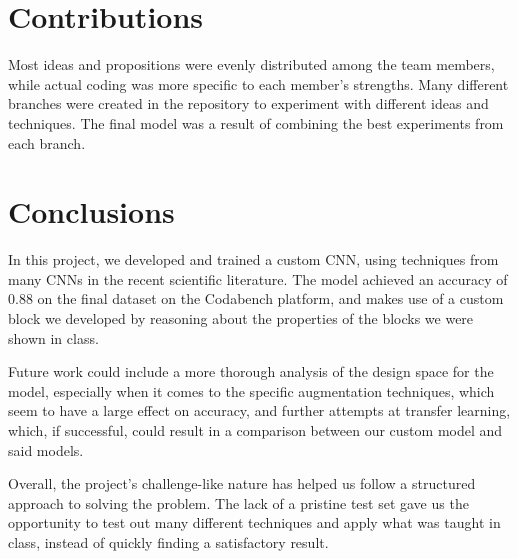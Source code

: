 \documentclass[11pt]{article}
\begin{document}
\begin{multicols}{2}
      \section{Contributions}

      Most ideas and propositions were evenly distributed among the team
      members, while actual coding was more specific to each member's
      strengths. Many different branches were created in the repository to
      experiment with different ideas and techniques. The final model was a
      result of combining the best experiments from each branch.

      \section{Conclusions}

      In this project, we developed and trained a custom CNN, using techniques from many CNNs in the recent scientific literature. The model achieved an accuracy of 0.88 on the final dataset on the Codabench platform, and makes use of a custom block we developed by reasoning about the properties of the blocks we were shown in class. 

      Future work could include a more thorough analysis of the design space for the model, especially when it comes to the specific augmentation techniques, which seem to have a large effect on accuracy, and further attempts at transfer learning, which, if successful, could result in a comparison between our custom model and said models.

      Overall, the project's challenge-like nature has helped us follow a
      structured approach to solving the problem. The lack of a pristine test set gave us the opportunity to test out many different techniques and apply what was taught in class, instead of quickly finding a satisfactory result. 

      
      

\end{multicols}
\end{document}
